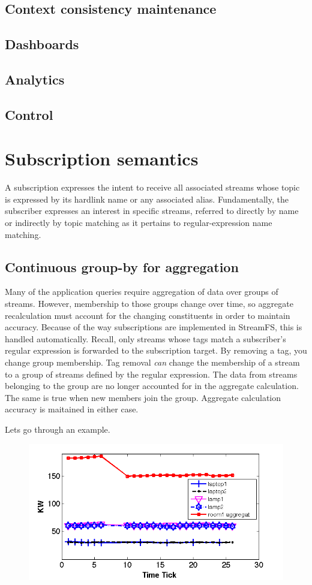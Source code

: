 \documentclass[10pt,print,letterpaper]{sigplan-proc-varsize}
\begin{document}
\subsection{Context consistency maintenance}
\subsection{Dashboards}
\subsection{Analytics}
\subsection{Control}

\section{Subscription semantics}
A subscription expresses the intent to receive all associated streams whose topic is expressed by its hardlink name
or any associated alias.  Fundamentally, the subscriber expresses an interest in specific streams, referred to
directly by name or indirectly by topic matching as it pertains to regular-expression name matching.

\subsection{Continuous group-by for aggregation}
Many of the application queries require aggregation of data over groups of streams.  However, membership to those groups
change over time, so aggregate recalculation must account for the changing constituents in order to maintain accuracy.
Because of the way subscriptions are implemented in StreamFS, this is handled automatically.  Recall, only 
streams whose tags match a subscriber's regular expression is forwarded to the subscription target.  By removing 
a tag, you change group membership.  Tag removal \emph{can} change the membership of a stream to a group of streams
defined by the regular expression.  The data from streams belonging to the group are no longer accounted for in the aggregate
calculation.  The same is true when new members join the group.  Aggregate calculation accuracy is maitained
in either case.

Lets go through an example.

\begin{figure}
\centering
\includegraphics[width=.45\textwidth]{figs/dynagg_scenario1_room1.png}
\caption{}
\label{fig:dynagg}
\end{figure}
\end{document}
